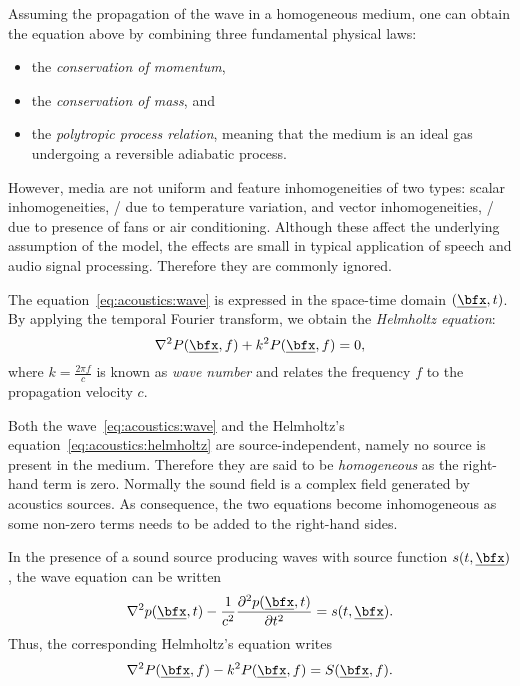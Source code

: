 \mynewline
Assuming the propagation of the wave in a homogeneous medium, one can obtain the equation above by combining three fundamental physical laws:
\begin{itemize}
    \item the \textit{conservation of momentum},
    \item the \textit{conservation of mass}, and
    \item the \textit{polytropic process relation}, meaning that the medium is an ideal gas undergoing a reversible adiabatic process.
\end{itemize}

However, media are not uniform and feature inhomogeneities of two types:
scalar inhomogeneities, \eg/ due to temperature variation,
and vector inhomogeneities, \eg/ due to presence of fans or air conditioning.
Although these affect the underlying assumption of the model, the effects are small in typical application of speech and audio signal processing.
Therefore they are commonly ignored.

The equation~\ref{eq:acoustics:wave} is expressed in the space-time domain $\depSpaceTime$.
By applying the temporal Fourier transform, we obtain the \textit{Helmholtz equation}:
\begin{equation}
    \label{eq:acoustics:helmholtz}
    \knabla^2 P(\positionMicrophone, f) + k^2 P(\positionMicrophone, f) = 0
    ,
\end{equation}
where $k = \frac{2 \pi f}{c}$  is known as \textit{wave number} and relates the frequency $f$ to the propagation velocity $c$.

Both the wave~\ref{eq:acoustics:wave} and the Helmholtz's equation~\ref{eq:acoustics:helmholtz} are source-independent,
namely no source is present in the medium.
Therefore they are said to be \textit{homogeneous} as the right-hand term is zero.
Normally the sound field is a complex field generated by acoustics sources.
As consequence, the two equations become inhomogeneous as some non-zero terms needs to be added to the right-hand sides.

In the presence of a sound source producing waves with source function $s(t, \positionMicrophone)$, the wave equation can be written
\begin{equation}
    \label{eq:acoustics:source}
    \knabla^2 \pressureSpaceTime - \frac{1}{\speedOfSound^2} \kpderiv[2]{\pressureSpaceTime}{t} = s(t, \positionMicrophone)
    .
\end{equation}
Thus, the corresponding Helmholtz's equation writes
\begin{equation}
    \label{eq:acoustics:source_freq}
    \knabla^2 P(\positionMicrophone, f) - k^2 P(\positionMicrophone, f) = S(\positionMicrophone, f)
    .
\end{equation}

